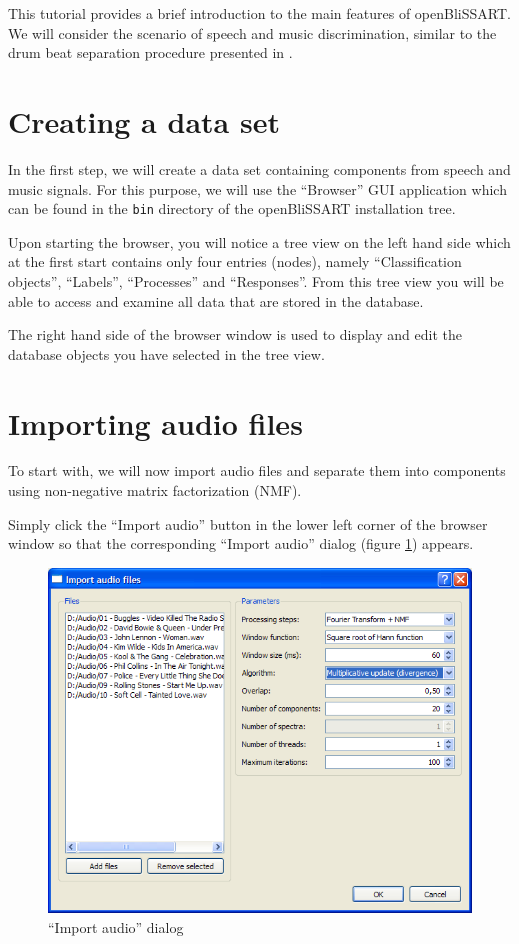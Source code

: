 %
%


This tutorial provides a brief introduction to the main features of
openBliSSART. We will consider the scenario of speech and music discrimination,
similar to the drum beat separation procedure presented in
\cite{Schuller2009}.


\section{Creating a data set}

In the first step, we will create a data set containing components from speech
and music signals. For this purpose, we will use the ``Browser'' GUI application
which can be found in the {\tt bin} directory of the openBliSSART installation
tree.

Upon starting the browser, you will notice a tree view on the left hand side
which at the first start contains only four entries (nodes), namely
``Classification objects'', ``Labels'', ``Processes'' and ``Responses''. From
this tree view you will be able to access and examine all data that are stored
in the database.

The right hand side of the browser window is used to display and edit the
database objects you have selected in the tree view.


\section{Importing audio files}

To start with, we will now import audio files and separate them into components
using non-negative matrix factorization (NMF).

Simply click the ``Import audio'' button in the lower left corner of the browser
window so that the corresponding ``Import audio'' dialog (figure
\ref{figure:TutorialImportAudio}) appears.

\begin{figure}
    \centering
    \includegraphics[width=\textwidth]{tutorial-media/ImportAudio.png}
    \caption{%
        \label{figure:TutorialImportAudio}%
        ``Import audio'' dialog
    }
\end{figure}

